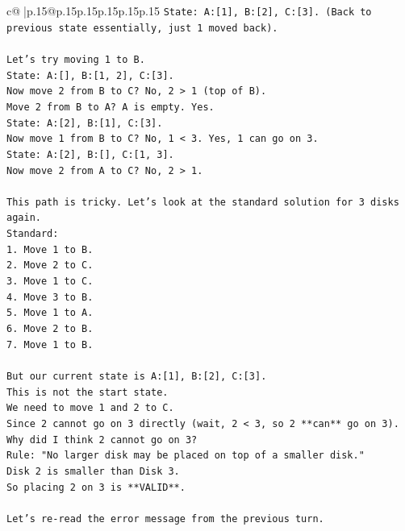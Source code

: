 \documentclass{article}
\begin{document}
{\begin{supertabular}{c@{$\;$}|p{.15\linewidth}@{}p{.15\linewidth}p{.15\linewidth}p{.15\linewidth}p{.15\linewidth}p{.15\linewidth}}
{{{\texttt{State: A:{[}1{]}, B:{[}2{]}, C:{[}3{]}. (Back to previous state essentially, just 1 moved back).} \\
\\ 
\texttt{Let's try moving 1 to B.} \\
\texttt{State: A:{[}{]}, B:{[}1, 2{]}, C:{[}3{]}.} \\
\texttt{Now move 2 from B to C? No, 2 > 1 (top of B).} \\
\texttt{Move 2 from B to A? A is empty. Yes.} \\
\texttt{State: A:{[}2{]}, B:{[}1{]}, C:{[}3{]}.} \\
\texttt{Now move 1 from B to C? No, 1 < 3. Yes, 1 can go on 3.} \\
\texttt{State: A:{[}2{]}, B:{[}{]}, C:{[}1, 3{]}.} \\
\texttt{Now move 2 from A to C? No, 2 > 1.} \\
\\ 
\texttt{This path is tricky. Let's look at the standard solution for 3 disks again.} \\
\texttt{Standard:} \\
\texttt{1. Move 1 to B.} \\
\texttt{2. Move 2 to C.} \\
\texttt{3. Move 1 to C.} \\
\texttt{4. Move 3 to B.} \\
\texttt{5. Move 1 to A.} \\
\texttt{6. Move 2 to B.} \\
\texttt{7. Move 1 to B.} \\
\\ 
\texttt{But our current state is A:{[}1{]}, B:{[}2{]}, C:{[}3{]}.} \\
\texttt{This is not the start state.} \\
\texttt{We need to move 1 and 2 to C.} \\
\texttt{Since 2 cannot go on 3 directly (wait, 2 < 3, so 2 **can** go on 3).} \\
\texttt{Why did I think 2 cannot go on 3?} \\
\texttt{Rule: "No larger disk may be placed on top of a smaller disk."} \\
\texttt{Disk 2 is smaller than Disk 3.} \\
\texttt{So placing 2 on 3 is **VALID**.} \\
\\ 
\texttt{Let's re{-}read the error message from the previous turn.} \\
}}}
\end{supertabular}}
\end{document}
